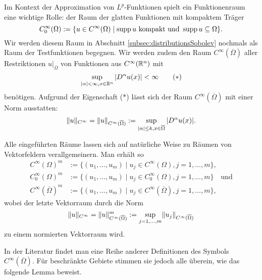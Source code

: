 Im Kontext der Approximation von $L^p$-Funktionen spielt ein Funktionenraum eine wichtige Rolle: der Raum der glatten Funktionen mit kompaktem Träger
$$
C_0^\infty(\Omega) := \{ u \in C^\infty(\Omega) \mid \operatorname{supp} u \text{ kompakt und } \operatorname{supp} u \subseteq \Omega\}.
$$
Wir werden diesem Raum in Abschnitt \ref{subsec:distributionsSobolev} nochmals als Raum der Testfunktionen begegnen.
Wir werden zudem den Raum $C^\infty(\overline\Omega)$ aller Restriktionen $u|_{\overline\Omega}$ von Funktionen aus $C^\infty(\mathbb{R}^n)$ mit
\begin{displaymath}
  \sup_{|\alpha| < \infty, x \in \mathbb{R}^n} |D^\alpha u(x)| < \infty \tag{$\ast$}
\end{displaymath}
benötigen.
Aufgrund der Eigenschaft ($\ast$) lässt sich der Raum $C^\infty(\overline\Omega)$ mit einer Norm ausstatten:
$$
\lVert u \rVert_{C^\infty} = \lVert u \rVert_{C^\infty(\overline\Omega)} := \sup_{|\alpha|\leq k, x \in \overline\Omega} |D^\alpha u(x)|.
$$

Alle eingeführten Räume lassen sich auf natürliche Weise zu Räumen von Vektorfeldern verallgemeinern.
Man erhält so
\begin{align*}
  C^\infty(\Omega)^m &:= \{(u_1,\dots,u_m) \mid u_j \in C^\infty(\Omega), j = 1,\dots,m\}, \\
  C_0^\infty(\Omega)^m &:= \{(u_1,\dots,u_m) \mid u_j \in C_0^\infty(\Omega), j = 1,\dots,m\} \quad\text{und} \\
  C^\infty(\overline\Omega)^m &:= \{(u_1,\dots,u_m) \mid u_j \in C^\infty(\overline\Omega), j = 1,\dots,m\},
\end{align*}
wobei der letzte Vektorraum durch die Norm
$$
\lVert u \rVert_{C^\infty} = \lVert u \rVert_{C^\infty(\overline\Omega)}^m := \sup_{j = 1,\dots, m} \lVert u_j \rVert_{C^\infty(\overline\Omega)}
$$
zu einem normierten Vektorraum wird.

In der Literatur findet man eine Reihe anderer Definitionen des Symbols $C^\infty(\overline\Omega)$.
Für beschränkte Gebiete stimmen sie jedoch alle überein, wie das folgende Lemma beweist.

